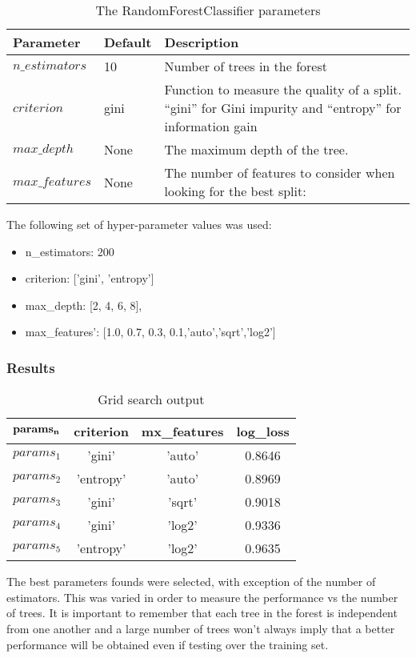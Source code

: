 \begin{table}[h!]
	\caption{The RandomForestClassifier parameters}
	\begin{tabular}{ | l | l | p{7cm} |}
		\hline
		\textbf{Parameter} & \textbf{Default} & \textbf{Description}\\
		\hline
		$n\_estimators$ & 10 & Number of trees in the forest\\
		\hline
		$criterion$ & gini & Function to measure the quality of a split. "`gini"' for Gini impurity and "`entropy"' for information gain\\
		\hline
		$max\_depth$ & None &The maximum depth of the tree.\\
		\hline
		$max\_features$ & None & The number of features to consider when looking for the best split:\\
		\hline
	\end{tabular}
	\label{table:RFdefaults}
\end{table}
The following set of hyper-parameter values was used:\\
\begin{itemize}
	\item n\_estimators: 200
	\item criterion: ['gini', 'entropy']
	\item max\_depth: [2, 4, 6, 8],
	\item max\_features': [1.0, 0.7, 0.3, 0.1,'auto','sqrt','log2']
\end{itemize}
\subsubsection{Results}
\begin{table}[h!]
	\caption{Grid search output}
	\centering
	\begin{tabular}{ | l | c | c | c |}
		\hline
		$\bf{params_n}$ & \bf{criterion} &  \bf{mx\_features} & \bf{log\_loss} \\ \hline
		$params_1$ & 'gini' & 'auto' & 0.8646 \\ \hline
		$params_2$ & 'entropy' & 'auto' & 0.8969 \\ \hline
		$params_3$ & 'gini' & 'sqrt' & 0.9018 \\ \hline
		$params_4$ & 'gini' & 'log2' & 0.9336 \\ \hline
		$params_5$ & 'entropy' & 'log2' & 0.9635 \\ \hline
	\end{tabular}
\end{table}
The best parameters founds were selected, with exception of the number of estimators. This was varied in order to measure the performance vs the number of trees. It is important to remember that each tree in the forest is independent from one another and a large number of trees won't always imply that a better performance will be obtained even if testing over the training set.\\

